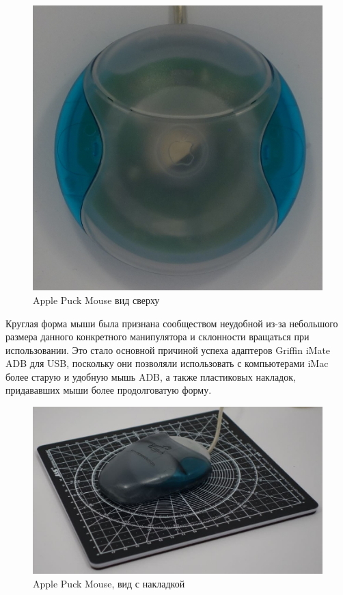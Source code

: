 \documentclass[11pt, a4paper]{article}
\begin{document}
\begin{figure}[h]
    \centering
    \includegraphics[scale=0.5]{1998_apple_puck/appleup.JPG}
    \caption{Apple Puck Mouse вид сверху}
    \label{fig:top}
\end{figure}

Круглая форма мыши была признана сообществом неудобной из-за небольшого размера данного конкретного манипулятора и склонности вращаться при использовании. 
Это стало основной причиной успеха адаптеров Griffin iMate ADB для USB, поскольку они позволяли использовать с компьютерами iMac более старую и удобную мышь ADB, а также пластиковых накладок, придававших мыши более продолговатую форму. 

\begin{figure}[h]
    \centering
    \includegraphics[scale=0.23]{1998_apple_puck/appp.jpg}
    \caption{Apple Puck Mouse, вид с накладкой}
    \label{fig:addon}
\end{figure}
\end{document}

